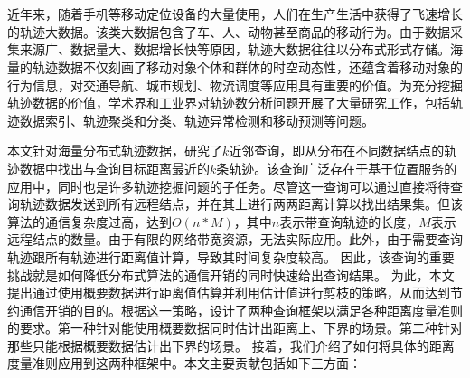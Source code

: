 \chapter*{}
近年来，随着手机等移动定位设备的大量使用，人们在生产生活中获得了飞速增长的轨迹大数据。该类大数据包含了车、人、动物甚至商品的移动行为。由于数据采集来源广、数据量大、数据增长快等原因，轨迹大数据往往以分布式形式存储。海量的轨迹数据不仅刻画了移动对象个体和群体的时空动态性，还蕴含着移动对象的行为信息，对交通导航、城市规划、物流调度等应用具有重要的价值。为充分挖掘轨迹数据的价值，学术界和工业界对轨迹数分析问题开展了大量研究工作，包括轨迹数据索引、轨迹聚类和分类、轨迹异常检测和移动预测等问题。

本文针对海量分布式轨迹数据，研究了$k$近邻查询，即从分布在不同数据结点的轨迹数据中找出与查询目标距离最近的$k$条轨迹。该查询广泛存在于基于位置服务的应用中，同时也是许多轨迹挖掘问题的子任务。尽管这一查询可以通过直接将待查询轨迹数据发送到所有远程结点，并在其上进行两两距离计算以找出结果集。但该算法的通信复杂度过高，达到$O(n*M)$，其中$n$表示带查询轨迹的长度，$M$表示远程结点的数量。由于有限的网络带宽资源，无法实际应用。此外，由于需要查询轨迹跟所有轨迹进行距离值计算，导致其时间复杂度较高。
因此，该查询的重要挑战就是如何降低分布式算法的通信开销的同时快速给出查询结果。
为此，本文提出通过使用概要数据进行距离值估算并利用估计值进行剪枝的策略，从而达到节约通信开销的目的。根据这一策略，设计了两种查询框架以满足各种距离度量准则的要求。第一种针对能使用概要数据同时估计出距离上、下界的场景。第二种针对那些只能根据概要数据估计出下界的场景。
接着，我们介绍了如何将具体的距离度量准则应用到这两种框架中。本文主要贡献包括如下三方面：

